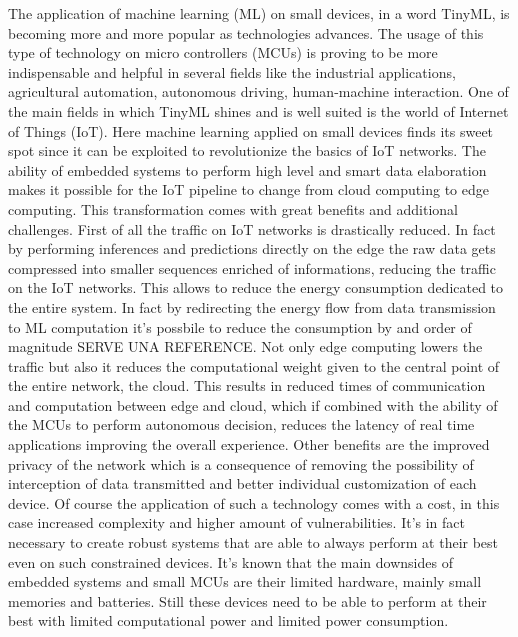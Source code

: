 \documentclass[12pt]{report}
\begin{document}
The application of machine learning (ML) on small devices, in a word TinyML, is becoming more and more popular as technologies advances. The usage of this type of technology on micro controllers (MCUs) is proving to be more indispensable and helpful in several fields like the industrial applications, agricultural automation, autonomous driving, human-machine interaction. One of the main fields in which TinyML shines and is well suited is the world of Internet of Things (IoT). Here machine learning applied on small devices finds its sweet spot since it can be exploited to revolutionize the basics of IoT networks. The ability of embedded systems to perform high level and smart data elaboration makes it possible for the IoT pipeline to change from cloud computing to edge computing. This transformation comes with great benefits and additional challenges. First of all the traffic on IoT networks is drastically reduced. In fact by performing inferences and predictions directly on the edge the raw data gets compressed into smaller sequences enriched of informations, reducing the traffic on the IoT networks. This allows to reduce the energy consumption dedicated to the entire system. In fact by redirecting the energy flow from data transmission to ML computation it's possbile to reduce the consumption by and order of magnitude \cite{} SERVE UNA REFERENCE. Not only edge computing lowers the traffic but also it reduces the computational weight given to the central point of the entire network, the cloud. This results in reduced times of communication and computation between edge and cloud, which if combined with the ability of the MCUs to perform autonomous decision, reduces the latency of real time applications improving the overall experience. Other benefits are the improved privacy of the network which is a consequence of removing the possibility of interception of data transmitted and better individual customization of each device. Of course the application of such a technology comes with a cost, in this case increased complexity and higher amount of vulnerabilities. It's in fact necessary to create robust systems that are able to always perform at their best even on such constrained devices. It's known that the main downsides of embedded systems and small MCUs are their limited hardware, mainly small memories and batteries. Still these devices need to be able to perform at their best with limited computational power and limited power consumption.\\
\end{document}
